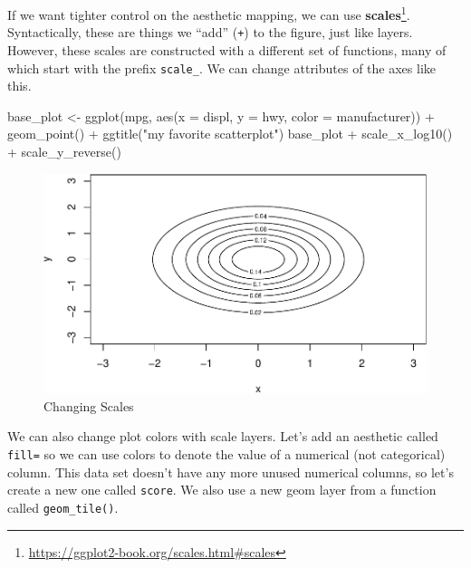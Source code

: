 \documentclass[
  12pt,
  krantz2]{krantz}
\makeatletter
\newenvironment{Shaded}{\begin{snugshade}}{\end{snugshade}}
\newcommand{\AttributeTok}[1]{\textcolor[rgb]{0.61,0.61,0.61}{#1}}
\newcommand{\FunctionTok}[1]{\textcolor[rgb]{0,0,0}{#1}}
\newcommand{\NormalTok}[1]{#1}
\newcommand{\OtherTok}[1]{\textcolor[rgb]{0.37,0.37,0.37}{#1}}
\newcommand{\SpecialCharTok}[1]{\textcolor[rgb]{0,0,0}{#1}}
\newcommand{\StringTok}[1]{\textcolor[rgb]{0.5,0.5,0.5}{#1}}
\renewcommand{\href}[2]{#2\footnote{\url{#1}}}
\newenvironment{kframe}{%
\medskip{}
\setlength{\fboxsep}{.8em}
 \def\at@end@of@kframe{}%
 \ifinner\ifhmode%
  \def\at@end@of@kframe{\end{minipage}}%
  \begin{minipage}{\columnwidth}%
 \fi\fi%
 \def\FrameCommand##1{\hskip\@totalleftmargin \hskip-\fboxsep
 \colorbox{shadecolor}{##1}\hskip-\fboxsep
     \hskip-\linewidth \hskip-\@totalleftmargin \hskip\columnwidth}%
 \MakeFramed {\advance\hsize-\width
   \@totalleftmargin\z@ \linewidth\hsize
   \@setminipage}}%
 {\par\unskip\endMakeFramed%
 \at@end@of@kframe}
\renewenvironment{Shaded}{\begin{kframe}}{\end{kframe}}
\makeatother
\begin{document}
If we want tighter control on the aesthetic mapping, we can use \href{https://ggplot2-book.org/scales.html\#scales}{\textbf{scales}}. Syntactically, these are things we ``add'' (\texttt{+}) to the figure, just like layers. However, these scales are constructed with a different set of functions, many of which start with the prefix \texttt{scale\_}. We can change attributes of the axes like this.

\begin{Shaded}
\begin{Highlighting}[]
\NormalTok{base\_plot }\OtherTok{\textless{}{-}} \FunctionTok{ggplot}\NormalTok{(mpg, }\FunctionTok{aes}\NormalTok{(}\AttributeTok{x =}\NormalTok{ displ, }\AttributeTok{y =}\NormalTok{ hwy, }\AttributeTok{color =}\NormalTok{ manufacturer))  }\SpecialCharTok{+}
             \FunctionTok{geom\_point}\NormalTok{() }\SpecialCharTok{+} 
             \FunctionTok{ggtitle}\NormalTok{(}\StringTok{"my favorite scatterplot"}\NormalTok{)}
\NormalTok{base\_plot }\SpecialCharTok{+} \FunctionTok{scale\_x\_log10}\NormalTok{() }\SpecialCharTok{+} \FunctionTok{scale\_y\_reverse}\NormalTok{()}
\end{Highlighting}
\end{Shaded}

\begin{figure}
\centering
\includegraphics{r_and_python_book_files/figure-latex/unnamed-chunk-225-1.pdf}
\caption{\label{fig:unnamed-chunk-225}Changing Scales}
\end{figure}

We can also change plot colors with scale layers. Let's add an aesthetic called \texttt{fill=} so we can use colors to denote the value of a numerical (not categorical) column. This data set doesn't have any more unused numerical columns, so let's create a new one called \texttt{score}. We also use a new geom layer from a function called \texttt{geom\_tile()}.
\end{document}
